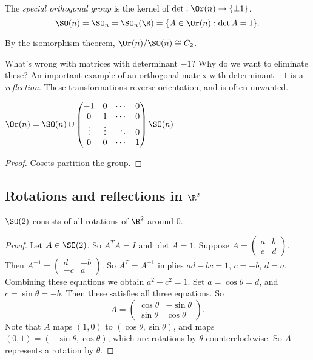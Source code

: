 \documentclass[a4paper]{article}
\begin{document}
\begin{defi}
  The \emph{special orthogonal group} is the kernel of $\det: \Or(n) \to \{\pm 1\}$.
  \[
    \SO(n) =\SO_n = \SO_n(\R) = \{A\in \Or(n): \det A = 1\}.
  \]
\end{defi}
By the isomorphism theorem, $\Or(n)/\SO(n) \cong C_2$.

What's wrong with matrices with determinant $-1$? Why do we want to eliminate these? An important example of an orthogonal matrix with determinant $-1$ is a \emph{reflection}. These transformations reverse orientation, and is often unwanted.

\begin{lemma}
  $\Or(n) = \SO(n) \cup
  \begin{pmatrix}
    -1 & 0 &\cdots & 0\\
    0 & 1 & \cdots & 0\\
    \vdots & \vdots & \ddots & 0\\
    0 & 0 & \cdots &1
  \end{pmatrix}\SO(n)$
\end{lemma}

\begin{proof}
  Cosets partition the group.
\end{proof}
\subsection{Rotations and reflections in \texorpdfstring{$\R^2$}{R2}}
\begin{lemma}
  $\SO(2)$ consists of all rotations of $\R^2$ around 0.
\end{lemma}

\begin{proof}
  Let $A\in \SO(2)$. So $A^TA = I$ and $\det A = 1$. Suppose $A =
  \begin{pmatrix}
    a & b\\c & d
  \end{pmatrix}$. Then $A^{-1} =
  \begin{pmatrix}
    d & -b\\-c & a
  \end{pmatrix}.$ So $A^T = A^{-1}$ implies $ad - bc = 1$, $c = -b$, $d = a$. Combining these equations we obtain $a^2 + c^2 = 1$. Set $a = \cos\theta = d$, and $c = \sin\theta = -b$. Then these satisfies all three equations. So
  \[
    A =
    \begin{pmatrix}
      \cos\theta & -\sin\theta\\
      \sin\theta & \cos\theta
    \end{pmatrix}.
  \]
  Note that $A$ maps $(1, 0)$ to $(\cos\theta, \sin \theta)$, and maps $(0, 1)= (-\sin\theta, \cos\theta)$, which are rotations by $\theta$ counterclockwise. So $A$ represents a rotation by $\theta$.
\end{proof}
\end{document}
